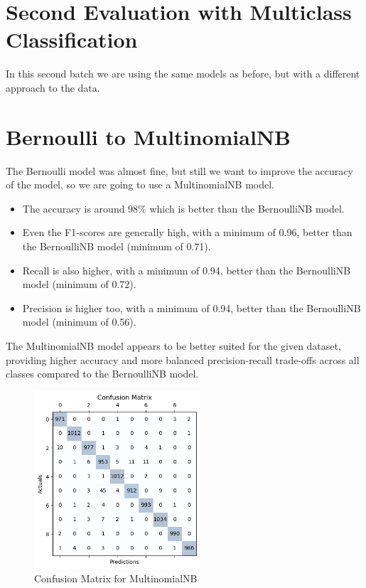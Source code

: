\documentclass{article}
\begin{document}
\begin{titlepage}
  \section*{Second Evaluation with Multiclass Classification}
  In this second batch we are using the same models as before, but with a different approach to the data.

  \section{Bernoulli to MultinomialNB}
  The Bernoulli model was almost fine, but still we want to improve the accuracy of the model, so we are going to use a MultinomialNB model.

  \begin{itemize}
    \item The accuracy is around 98\% which is better than the BernoulliNB model.
    \item Even the F1-scores are generally high, with a minimum of 0.96, better than the BernoulliNB model (minimum of 0.71).
    \item Recall is also higher, with a minimum of 0.94, better than the BernoulliNB model (minimum of 0.72).
    \item Precision is higher too, with a minimum of 0.94, better than the BernoulliNB model (minimum of 0.56).
  \end{itemize}

  The MultinomialNB model appears to be better suited for the given dataset, providing higher accuracy and more balanced precision-recall trade-offs across all classes compared to the BernoulliNB model.
  \newline
  \newline

  \begin{figure}[htbp]
    \centering
    \includegraphics[width=0.55\textwidth]{MNCM.png}
    \caption{Confusion Matrix for MultinomialNB}
    \label{fig:sample4}
  \end{figure}


\end{titlepage}
\end{document}
